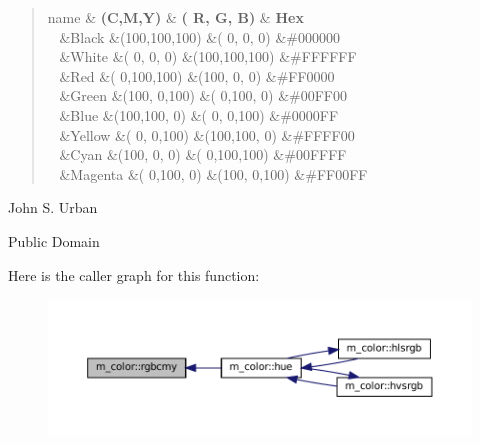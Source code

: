 \begin{DoxyDescription}
\begin{quote}
\begin{longtabu}
{name  }&\textbf{ (C,M,Y) }&\textbf{ ( R, G, B) }&\textbf{ Hex  }\\
\endhead
~ &Black &(100,100,100) &( 0, 0, 0) &\#000000  \\
~ &White &( 0, 0, 0) &(100,100,100) &\#\+F\+F\+F\+F\+FF  \\
~ &Red &( 0,100,100) &(100, 0, 0) &\#\+F\+F0000  \\
~ &Green &(100, 0,100) &( 0,100, 0) &\#00\+F\+F00  \\
~ &Blue &(100,100, 0) &( 0, 0,100) &\#0000\+FF  \\
~ &Yellow &( 0, 0,100) &(100,100, 0) &\#\+F\+F\+F\+F00  \\
~ &Cyan &(100, 0, 0) &( 0,100,100) &\#00\+F\+F\+FF  \\
~ &Magenta &( 0,100, 0) &(100, 0,100) &\#\+F\+F00\+FF  \\
\end{longtabu}
\end{quote}





\item[A\+U\+T\+H\+OR ]

John S. Urban




\item[L\+I\+C\+E\+N\+SE ]

Public Domain




\end{DoxyDescription}Here is the caller graph for this function\+:\nopagebreak
\begin{figure}[H]
\begin{center}
\leavevmode
\includegraphics[width=350pt]{namespacem__color_ad6e8505eef5add299c4475d289f3c5c5_icgraph}
\end{center}
\end{figure}
\mbox{\label{namespacem__color_a1dd027cbe65112af243d26195b1fc49a}} 
